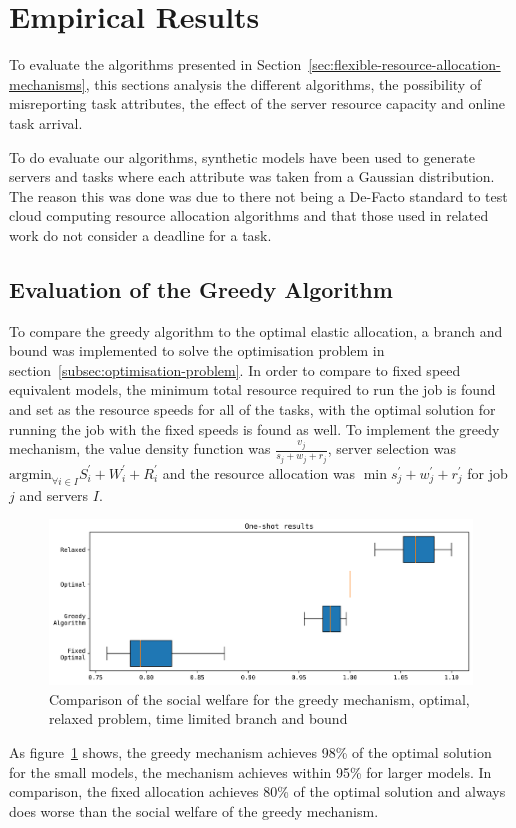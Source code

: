\section{Empirical Results}
\label{sec:empirical-results}
To evaluate the algorithms presented in Section~\ref{sec:flexible-resource-allocation-mechanisms},
this sections analysis the different algorithms, the possibility of misreporting task attributes, 
the effect of the server resource capacity and online task arrival. 

To do evaluate our algorithms, synthetic models have been used to generate servers and tasks where
each attribute was taken from a Gaussian distribution. The reason this was done was due to there not
being a De-Facto standard to test cloud computing resource allocation algorithms and that those used
in related work do not consider a deadline for a task.

\subsection{Evaluation of the Greedy Algorithm}
\label{subsec:evaluation-of-the-greedy-algorithm}
To compare the greedy algorithm to the optimal elastic allocation, a branch and bound was implemented to solve the
optimisation problem in section~\ref{subsec:optimisation-problem}. In order to compare to fixed speed equivalent models,
the minimum total resource required to run the job is found and set as the resource speeds for all of the tasks, with
the optimal solution for running the job with the fixed speeds is found as well. To implement the greedy mechanism, the
value density function was $\frac{v_j}{s_j + w_j + r_j}$, server selection was
$\text{argmin}_{\forall i \in I} S^{'}_i + W^{'}_i + R^{'}_i$ and the resource allocation was
$\min s^{'}_j + w^{'}_j + r^{'}_j$ for job $j$ and servers $I$.

\begin{figure}[h]
    \centering
    \includegraphics[width=\linewidth]{figs/greedy/greedy_algorithms.png}
    \caption{Comparison of the social welfare for the greedy mechanism, optimal, relaxed problem, time limited branch and bound}
    \label{fig:greedy-mechanism-comparison}
\end{figure}
As figure~\ref{fig:greedy-mechanism-comparison} shows, the greedy mechanism achieves 98\% of the optimal solution for
the small models, the mechanism achieves within 95\% for larger models. In comparison, the fixed allocation achieves
80\% of the optimal solution and always does worse than the social welfare of the greedy mechanism.

